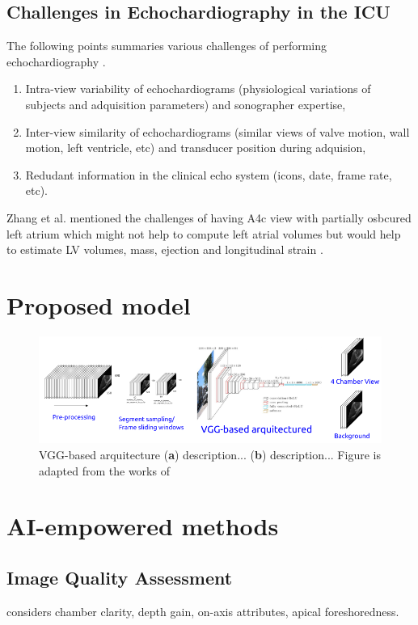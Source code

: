 \subsection{Challenges in Echochardiography in the ICU}
The following points summaries various challenges of performing echochardiography \cite{khamis2017}.
\begin{enumerate}
  \item Intra-view variability of echochardiograms (physiological variations of subjects and adquisition parameters) and sonographer expertise,
  \item Inter-view similarity of echochardiograms (similar views of valve motion, wall motion, left ventricle, etc) and transducer position during adquision,
  \item Redudant information in the clinical echo system (icons, date, frame rate, etc).
\end{enumerate}
Zhang et al. mentioned the challenges of having A4c view with partially osbcured left atrium which might not help to compute left atrial volumes but would help to estimate LV volumes, mass, ejection and longitudinal strain \cite{zhang2018}.



\section{Proposed model}
\begin{figure}[h]
\centerline{
\includegraphics[width=\columnwidth]{../figures/VGG-based-arquitecture/versions/drawing-v00}
}
\caption{
	VGG-based arquitecture
	(\textbf{a}) description...
	(\textbf{b}) description...
	Figure is adapted from the works of %
}
\end{figure}



\section{AI-empowered methods}

\subsection{Image Quality Assessment}
\cite{labs2021_in_miua} considers chamber clarity, depth gain, on-axis attributes, apical foreshoredness.


